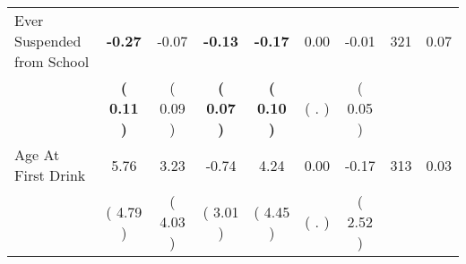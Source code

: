 \begin{tabular}{lcccccccc}
Ever Suspended from School & \textbf{    -0.27} &     -0.07 & \textbf{    -0.13} & \textbf{    -0.17} &      0.00 &     -0.01 & 321 &       0.07 \\ 
 & \textbf{(     0.11 )} & (     0.09 ) & \textbf{(     0.07 )} & \textbf{(     0.10 )} & (        . ) & (     0.05 ) & \\
Age At First Drink &      5.76 &      3.23 &     -0.74 &      4.24 &      0.00 &     -0.17 & 313 &       0.03 \\ 
 & (     4.79 ) & (     4.03 ) & (     3.01 ) & (     4.45 ) & (        . ) & (     2.52 ) & \\
\bottomrule
\end{tabular}
